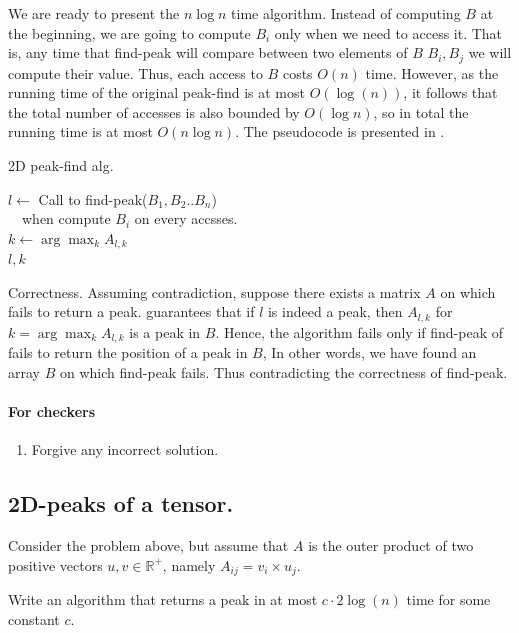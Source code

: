 We are ready to present the $n\log n$ time algorithm. Instead of computing $B$ at the beginning, we are going to compute $B_{i}$ only when we need to access it. That is, any time that find-peak will compare between two elements of $B$ $B_{i},B_{j}$ we will compute their value. Thus, each access to $B$ costs $O(n)$ time. However, as the running time of the original peak-find is at most $O(\log(n))$, it follows that the total number of accesses is also bounded by $O(\log n)$, so in total the running time is at most $O(n\log n)$. The pseudocode is presented in .
\begin{algorithm} 
\caption{2D peak-find alg.} \label{alg:2D}
$l \leftarrow $ Call to find-peak($B_{1}, B_{2} .. B_{n}$) \\ 
\ \ when compute $B_{i}$ on every accsses.  \\
$k \leftarrow \arg \max_{k}A_{l,k}$\\
\Return $l, k$  
\end{algorithm}

Correctness. Assuming contradiction, suppose there exists a matrix $A$ on which  fails to return a peak.  guarantees that if $l$ is indeed a peak, then $A_{l,k}$ for $k = \arg \max_{k}A_{l,k}$ is a peak in $B$. Hence, the algorithm fails only if find-peak of fails to return the position of a peak in $B$, In other words, we have found an array $B$ on which find-peak fails. Thus contradicting the correctness of find-peak.
\fi

\ifdefined\CHECK 
\paragraph{For checkers}
\begin{enumerate}
  \item Forgive any incorrect solution. 
\end{enumerate}
\fi


\ifdefined\DPEAK
\ifdefined\SOLUTION


\subsection{2D-peaks of a tensor.} Consider the problem above, but assume that $A$ is the outer product of two positive vectors $u,v \in \mathbb{R}^{+}$, namely $A_{ij} = v_i \times u_j$.

Write an algorithm that returns a peak in at most $c \cdot 2 \log(n)$ time for some constant $c$.


